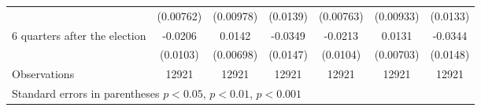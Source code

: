 \begin{table}[!ht]
\begin{tabular}{l*{6}{c}}
                    &   (0.00762)         &   (0.00978)         &    (0.0139)         &   (0.00763)         &   (0.00933)         &    (0.0133)         \\
[0,5em]
 6 quarters after the election&     -0.0206\sym{*}  &      0.0142\sym{*}  &     -0.0349\sym{*}  &     -0.0213\sym{*}  &      0.0131         &     -0.0344\sym{*}  \\
                    &    (0.0103)         &   (0.00698)         &    (0.0147)         &    (0.0104)         &   (0.00703)         &    (0.0148)         \\
\hline
Observations        &       12921         &       12921         &       12921         &       12921         &       12921         &       12921         \\
\hline\hline
\multicolumn{7}{l}{\footnotesize Standard errors in parentheses \sym{*} \(p<0.05\), \sym{**} \(p<0.01\), \sym{***} \(p<0.001\)}\\
\end{tabular}
\end{table}

